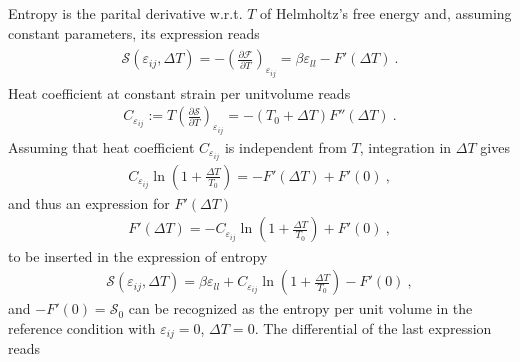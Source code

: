 \documentclass[letterpaper,10pt,english]{jupyterBook}
\begin{document}
\sphinxAtStartPar
{} Entropy is the parital derivative w.r.t. \(T\) of Helmholtz’s free energy and, assuming constant parameters, its expression reads
\begin{equation*}
\begin{split}\begin{aligned}
  \mathcal{S}(\varepsilon_{ij}, \Delta T) 
  = - \left( \frac{\partial \mathcal{F}}{\partial T} \right)_{\varepsilon_{ij}} 
  = \beta \varepsilon_{ll} - F'(\Delta T) \ .
\end{aligned}\end{split}
\end{equation*}
\sphinxAtStartPar
{} Heat coefficient at constant strain per unit\sphinxhyphen{}volume reads
\begin{equation*}
\begin{split}C_{\varepsilon_{ij}} := T \left( \frac{\partial \mathcal{S}}{\partial T} \right)_{\varepsilon_{ij}} = - (T_0 + \Delta T) F''(\Delta T) \ .\end{split}
\end{equation*}
\sphinxAtStartPar
Assuming that heat coefficient \(C_{\varepsilon_{ij}}\) is independent from \(T\), integration in \(\Delta T\) gives
\begin{equation*}
\begin{split}C_{\varepsilon_{ij}} \ln \left( 1 + \frac{\Delta T}{T_0} \right) = - F'(\Delta T) + F'(0) \ ,\end{split}
\end{equation*}
\sphinxAtStartPar
and thus an expression for \(F'(\Delta T)\)
\begin{equation*}
\begin{split}F'(\Delta T) = - C_{\varepsilon_{ij}} \ln \left( 1 + \frac{\Delta T}{T_0} \right) + F'(0) \ ,\end{split}
\end{equation*}
\sphinxAtStartPar
to be inserted in the expression of entropy
\begin{equation*}
\begin{split}\mathcal{S}(\varepsilon_{ij}, \Delta T) = \beta \varepsilon_{ll} + C_{\varepsilon_{ij}} \ln \left( 1 + \frac{\Delta T}{T_0} \right) - F'(0) \ ,\end{split}
\end{equation*}
\sphinxAtStartPar
and \(-F'(0) = \mathcal{S}_0\) can be recognized as the entropy per unit volume in the reference condition with \(\varepsilon_{ij} = 0\), \(\Delta T = 0\). The differential of the last expression reads
\end{document}
